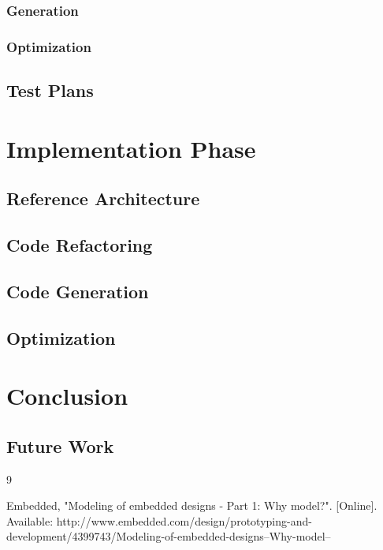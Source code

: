 \documentclass{report}
\begin{document}
		\subsection{Generation}

		\subsection{Optimization}

	\section{Test Plans}
	
\chapter{Implementation Phase}

	\section{Reference Architecture}

	\section{Code Refactoring}

	\section{Code Generation}

	\section{Optimization}

\chapter{Conclusion}

	\section{Future Work}

\newpage
	
\begin{thebibliography} {9}
	
	 Embedded, "Modeling of embedded designs - Part 1: Why model?". [Online]. Available: http://www.embedded.com/design/prototyping-and-development/4399743/Modeling-of-embedded-designs--Why-model--
			
\end{thebibliography}
	
\end{document}
